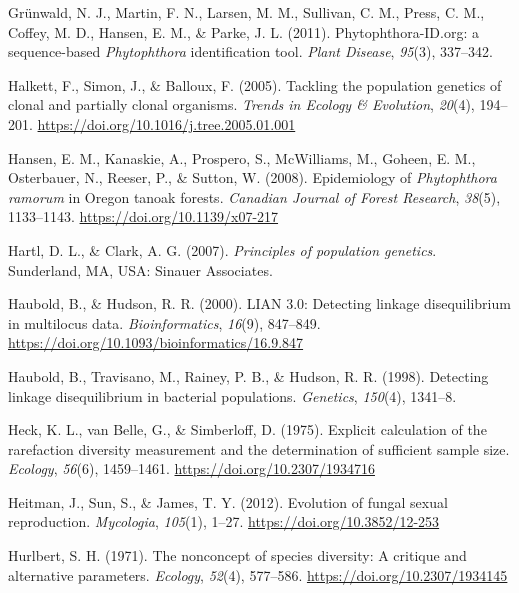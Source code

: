 \documentclass[double,11pt]{beavtex}
\begin{document}
  \hypertarget{ref-grunwald2011phytophthora}{}
  Grünwald, N. J., Martin, F. N., Larsen, M. M., Sullivan, C. M., Press,
  C. M., Coffey, M. D., Hansen, E. M., \& Parke, J. L. (2011).
  Phytophthora-ID.org: a sequence-based \emph{Phytophthora} identification
  tool. \emph{Plant Disease}, \emph{95}(3), 337--342.
  
  \hypertarget{ref-halkett2005tackling}{}
  Halkett, F., Simon, J., \& Balloux, F. (2005). Tackling the population
  genetics of clonal and partially clonal organisms. \emph{Trends in
  Ecology \& Evolution}, \emph{20}(4), 194--201.
  \url{https://doi.org/10.1016/j.tree.2005.01.001}
  
  \hypertarget{ref-hansen2008epidemiology}{}
  Hansen, E. M., Kanaskie, A., Prospero, S., McWilliams, M., Goheen, E.
  M., Osterbauer, N., Reeser, P., \& Sutton, W. (2008). Epidemiology of
  \emph{Phytophthora ramorum} in Oregon tanoak forests. \emph{Canadian
  Journal of Forest Research}, \emph{38}(5), 1133--1143.
  \url{https://doi.org/10.1139/x07-217}
  
  \hypertarget{ref-hartl1997principles}{}
  Hartl, D. L., \& Clark, A. G. (2007). \emph{Principles of population
  genetics}. Sunderland, MA, USA: Sinauer Associates.
  
  \hypertarget{ref-Haubold:2000}{}
  Haubold, B., \& Hudson, R. R. (2000). LIAN 3.0: Detecting linkage
  disequilibrium in multilocus data. \emph{Bioinformatics}, \emph{16}(9),
  847--849. \url{https://doi.org/10.1093/bioinformatics/16.9.847}
  
  \hypertarget{ref-haubold1998detecting}{}
  Haubold, B., Travisano, M., Rainey, P. B., \& Hudson, R. R. (1998).
  Detecting linkage disequilibrium in bacterial populations.
  \emph{Genetics}, \emph{150}(4), 1341--8.
  
  \hypertarget{ref-heck1975explicit}{}
  Heck, K. L., van Belle, G., \& Simberloff, D. (1975). Explicit
  calculation of the rarefaction diversity measurement and the
  determination of sufficient sample size. \emph{Ecology}, \emph{56}(6),
  1459--1461. \url{https://doi.org/10.2307/1934716}
  
  \hypertarget{ref-heitman2012evolution}{}
  Heitman, J., Sun, S., \& James, T. Y. (2012). Evolution of fungal sexual
  reproduction. \emph{Mycologia}, \emph{105}(1), 1--27.
  \url{https://doi.org/10.3852/12-253}
  
  \hypertarget{ref-hurlbert1971nonconcept}{}
  Hurlbert, S. H. (1971). The nonconcept of species diversity: A critique
  and alternative parameters. \emph{Ecology}, \emph{52}(4), 577--586.
  \url{https://doi.org/10.2307/1934145}
  
\end{document}
